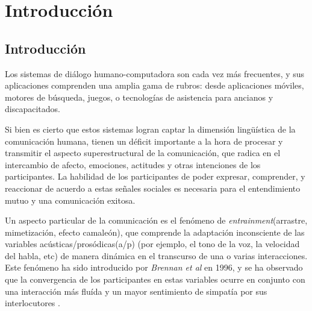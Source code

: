 \documentclass[11pt,a4paper,twoside]{tesis}
\begin{document}
\def\titulo{Licenciado }

\def\autor{Juan Manuel Pérez}
\def\tituloTesis{Mimetización entre interlocutores}
\def\runtitulo{Medición de la mimetización entre interlocutores utilizando series de tiempo}
\def\runtitle{Measuring entrainment between speakers using time series}
\def\director{Agustín Gravano}
\def\codirector{Ramiro Gálvez}
\def\lugar{Buenos Aires, 2015}


\frontmatter
\pagestyle{empty}



\tableofcontents

\mainmatter
\pagestyle{headings}


\chapter{Introducción}

\section{Introducción}

Los sistemas de diálogo humano-computadora son cada vez más frecuentes, y sus aplicaciones comprenden una amplia gama de rubros: desde aplicaciones móviles, motores de búsqueda, juegos, o tecnologías de asistencia para ancianos y discapacitados.

Si bien es cierto que estos sistemas logran captar la dimensión lingüística de la comunicación humana, tienen un déficit importante a la hora de procesar y transmitir el aspecto superestructural de la comunicación, que radica en el intercambio de afecto, emociones, actitudes y otras intenciones de los participantes. La habilidad de los participantes de poder expresar, comprender, y reaccionar de acuerdo a estas señales sociales es necesaria para el entendimiento mutuo y una comunicación exitosa.

Un aspecto particular de la comunicación es el fenómeno de \emph{entrainment}(arrastre, mimetización, efecto camaleón), que comprende la adaptación inconsciente de las variables acústicas/prosódicas(a/p) (por ejemplo, el tono de la voz, la velocidad del habla, etc) de manera dinámica en el transcurso de una o varias interacciones. Este fenómeno ha sido introducido por \emph{Brennan et al}\cite{BRE1996} en 1996, y se ha observado que la convergencia de los participantes en estas variables ocurre en conjunto con una interacción más fluída y un mayor sentimiento de simpatía por sus interlocutores \cite{CHAR1999}.
\end{document}
